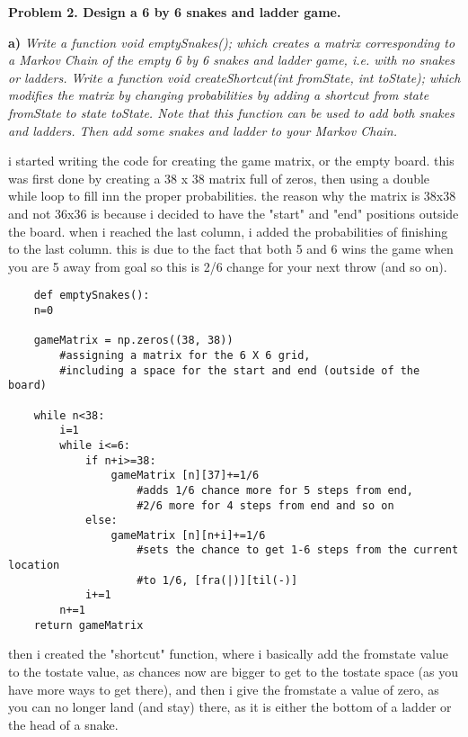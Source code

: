\documentclass{article}
\begin{document}
\textbf{Problem 2. Design a 6 by 6 snakes and ladder game.}

\textbf{a)}
\textit{Write a function
void emptySnakes();
which creates a matrix corresponding to a Markov Chain of the empty
6 by 6 snakes and ladder game, i.e. with no snakes or ladders.
Write a function
void createShortcut(int fromState, int toState);
which modifies the matrix by changing probabilities by adding a
shortcut from state fromState to state toState. Note that this function
can be used to add both snakes and ladders.
Then add some snakes and ladder to your Markov Chain.}
\vspace{10pt}

i started writing the code for creating the game matrix, or the empty board. this was first done by creating a 38 x 38 matrix full of zeros, then using a double while loop to fill inn the proper probabilities. the reason why the matrix is 38x38 and not 36x36 is because i decided to have the "start" and "end" positions  outside the board. when i reached the last column, i added the probabilities of finishing to the last column. this is due to the fact that both 5 and 6 wins the game when you are 5 away from goal so this is 2/6 change for your next throw (and so on).

\begin{verbatim}
    def emptySnakes():      
    n=0

    gameMatrix = np.zeros((38, 38))  
        #assigning a matrix for the 6 X 6 grid, 
        #including a space for the start and end (outside of the board)

    while n<38:
        i=1
        while i<=6:
            if n+i>=38:
                gameMatrix [n][37]+=1/6          
                    #adds 1/6 chance more for 5 steps from end, 
                    #2/6 more for 4 steps from end and so on
            else:
                gameMatrix [n][n+i]+=1/6          
                    #sets the chance to get 1-6 steps from the current location
                    #to 1/6, [fra(|)][til(-)]
            i+=1
        n+=1
    return gameMatrix
\end{verbatim}

then i created the "shortcut" function, where i basically add the fromstate value to the tostate value, as chances now are bigger to get to the tostate space (as you have more ways to get there), and then i give the fromstate a value of zero, as you can no longer land (and stay) there, as it is either the bottom of a ladder or the head of a snake.
\end{document}

